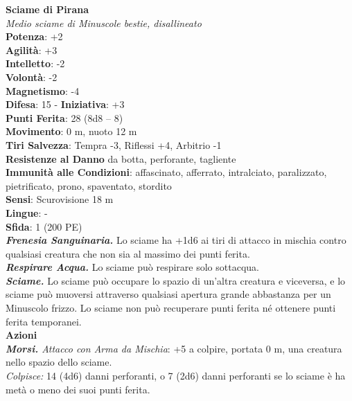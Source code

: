 \begin{multicols}{2}
\medskip\textbf{Sciame di Pirana}\\
\emph{Medio sciame di Minuscole bestie, disallineato}\\
\textbf{Potenza}: +2\\
\textbf{Agilità}: +3\\
\textbf{Intelletto}: -2\\
\textbf{Volontà}: -2\\
\textbf{Magnetismo}: -4\\
\textbf{Difesa}: 15 - \textbf{Iniziativa}: +3\\
\textbf{Punti Ferita}: 28 (8d8 -- 8)\\
\textbf{Movimento}: 0 m, nuoto 12 m\\
\textbf{Tiri Salvezza}: Tempra -3, Riflessi +4, Arbitrio -1\\
\textbf{Resistenze al Danno} da botta, perforante, tagliente\\
\textbf{Immunità alle Condizioni}: affascinato, afferrato, intralciato, paralizzato, pietrificato, prono, spaventato, stordito\\
\textbf{Sensi}: Scurovisione 18 m\\
\textbf{Lingue}: -\\
\textbf{Sfida}: 1 (200 PE)\smallskip\\
\emph{\textbf{Frenesia Sanguinaria.}} Lo sciame ha +1d6 ai tiri di attacco in mischia contro qualsiasi creatura che non sia al massimo dei punti ferita.\\
\emph{\textbf{Respirare Acqua.}} Lo sciame può respirare solo sottacqua.\\
\emph{\textbf{Sciame.}} Lo sciame può occupare lo spazio di un'altra creatura e viceversa, e lo sciame può muoversi attraverso qualsiasi apertura grande abbastanza per un Minuscolo frizzo. Lo sciame non può recuperare punti ferita né ottenere punti ferita temporanei.\\
\smallskip\textbf{Azioni}\\
\emph{\textbf{Morsi.} Attacco con Arma da Mischia}: +5 a colpire, portata 0 m, una creatura nello spazio dello sciame.\\
\emph{Colpisce:} 14 (4d6) danni perforanti, o 7 (2d6) danni perforanti se lo sciame è ha metà o meno dei suoi punti ferita.\\


\end{multicols}
